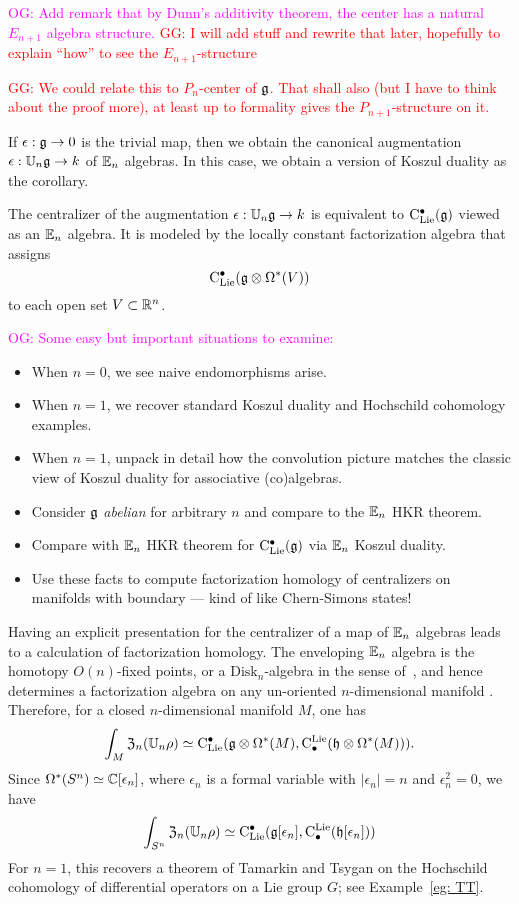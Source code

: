 \documentclass[11pt]{amsart}
\numberwithin{equation}{section}
\def\owen{\textcolor{magenta}{OG: }\textcolor{magenta}}
\def\greg{\textcolor{red}{GG: }\textcolor{red}}
\begin{document}
\owen{Add remark that by Dunn's additivity theorem, the center has a natural $E_{n+1}$ algebra structure.}
\greg{I will add stuff and rewrite that later, hopefully to explain ``how'' to see the $E_{n+1}$-structure}

\greg{We could relate this to $P_n$-center of $\mathfrak g$. That shall also (but I have to think about the proof more), 
at least up to formality gives the $P_{n+1}$-structure on it. }

If $\epsilon: \mathfrak g \to 0$ is the trivial map, then we obtain the canonical augmentation $\epsilon: \mathbb U_n \mathfrak g \to k$ of $\mathbb E_n$ algebras.
In this case, we obtain a version of Koszul duality as the corollary.

\begin{cor}
\label{thm: koszul duality}
The centralizer of the augmentation $\epsilon: \mathbb U_n \mathfrak g \to k$ is equivalent to ${\rm C}_{\rm Lie}^\bullet(\mathfrak g)$ viewed as an $\mathbb E_n$ algebra. It is modeled by the locally constant factorization algebra that assigns
\[
{\rm C}_{\rm Lie}^\bullet(\mathfrak g \otimes \Omega^*(V))
\]
to each open set $V \subset \mathbb R^n$.
\end{cor}

\owen{Some easy but important situations to examine:}
\begin{itemize}
\item When $n=0$, we see naive endomorphisms arise.
\item When $n=1$, we recover standard Koszul duality and Hochschild cohomology examples.
\item When $n=1$, unpack in detail how the convolution picture matches the classic view of Koszul duality for associative (co)algebras.
\item Consider $\mathfrak g$ {\em abelian} for arbitrary $n$ and compare to the $\mathbb E_n$ HKR theorem.
\item Compare with $\mathbb E_n$ HKR theorem for ${\rm C}_{\rm Lie}^\bullet(\mathfrak g)$ via $\mathbb E_n$ Koszul duality.
\item Use these facts to compute factorization homology of centralizers on manifolds with boundary --- kind of like Chern-Simons states!
\end{itemize}

Having an explicit presentation for the centralizer of a map of $\mathbb E_n$ algebras leads to a calculation of factorization homology.
The enveloping $\mathbb E_n$ algebra is the homotopy $O(n)$-fixed points, or a $\mathrm{Disk}_n$-algebra in the sense of~\cite{AF},
and hence determines a factorization algebra on any un-oriented $n$-dimensional manifold \cite{Knudsen}.
Therefore, for a closed $n$-dimensional manifold $M$, one has
\[
\int_M {\frak Z}_n(\mathbb U_n \rho) \simeq {\rm C}_{\rm Lie}^\bullet(\mathfrak g \otimes \Omega^*(M), {\rm C}^{\rm Lie}_\bullet( \mathfrak h \otimes \Omega^*(M))).
\]
Since $\Omega^*(S^n) \simeq \mathbb C[\epsilon_n]$, where $\epsilon_n$ is a formal variable with $|\epsilon_n| = n$ and $\epsilon_n^2 = 0$, we have
\[
\int_{S^n} {\frak Z}_n(\mathbb U_n \rho) \simeq {\rm C}_{\rm Lie}^\bullet(\mathfrak g[\epsilon_n], {\rm C}^{\rm Lie}_\bullet( \mathfrak h[\epsilon_n]))
\]
For $n=1$, this recovers a theorem of Tamarkin and Tsygan \cite{TT} on the Hochschild cohomology of differential operators on a Lie group $G$;
see Example~\ref{eg: TT}. 
\end{document}
